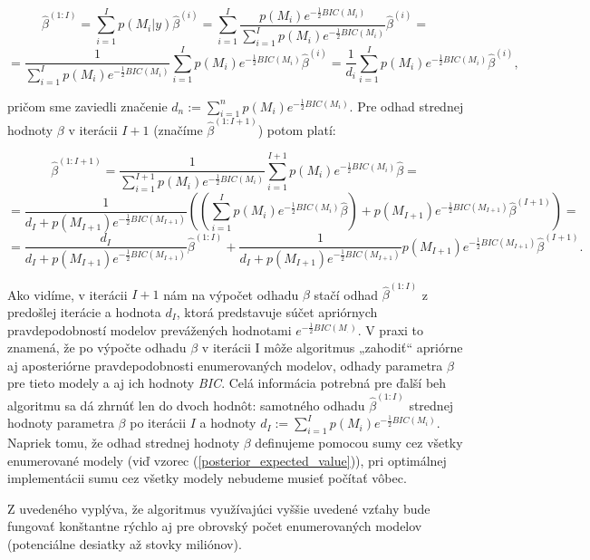 \[
    \hat{\beta}^{(1:I)} = \sum_{i = 1}^{I} p(M_i | y) \hat{\beta}^{(i)} = \sum_{i = 1}^{I} \frac{p(M_i) e^{-\frac{1}{2}BIC(M_i)}}{\sum_{i = 1}^{I} p(M_i) e^{-\frac{1}{2}BIC(M_i)}} \hat{\beta}^{(i)} =
\]
\begin{equation} \label{appendix__expected_value}
    = \frac{1}{\sum_{i = 1}^{I} p(M_i) e^{-\frac{1}{2}BIC(M_i)}} \sum_{i = 1}^{I} p(M_i) e^{-\frac{1}{2}BIC(M_i)} \hat{\beta}^{(i)} = \frac{1}{d_i} \sum_{i = 1}^{I} p(M_i) e^{-\frac{1}{2}BIC(M_i)} \hat{\beta}^{(i)},
\end{equation}

pričom sme zaviedli značenie \(d_n := \sum_{i = 1}^{n} p(M_i) e^{-\frac{1}{2}BIC(M_i)}\).
Pre odhad strednej hodnoty \(\beta\) v iterácii \(I + 1\) (značíme \(\hat{\beta}^{(1:I + 1)}\)) potom platí:

\[
    \hat{\beta}^{(1:I + 1)} = \frac{1}{\sum_{i = 1}^{I + 1} p(M_i) e^{-\frac{1}{2}BIC(M_i)}} \sum_{i = 1}^{I + 1} p(M_i) e^{-\frac{1}{2}BIC(M_i)} \hat{\beta} = 
\]
\[
    = \frac{1}{d_I + p(M_{I + 1}) e^{-\frac{1}{2}BIC(M_{I + 1})}} \left( \left( \sum_{i = 1}^{I} p(M_i) e^{-\frac{1}{2}BIC(M_i)} \hat{\beta} \right) + p(M_{I + 1}) e^{-\frac{1}{2}BIC(M_{I + 1})} \hat{\beta}^{(I+1)} \right) = 
\]
\[
    = \frac{d_I}{d_I + p(M_{I + 1}) e^{-\frac{1}{2}BIC(M_{I + 1})}} \hat{\beta}^{(1:I)} + \frac{1}{d_I + p(M_{I + 1}) e^{-\frac{1}{2}BIC(M_{I + 1})}} p(M_{I + 1}) e^{-\frac{1}{2}BIC(M_{I + 1})} \hat{\beta}^{(I+1)}.
\]

Ako vidíme, v iterácii \(I + 1\) nám na výpočet odhadu \(\beta\) stačí odhad \(\hat{\beta}^{(1:I)}\) z predošlej iterácie a hodnota \(d_I\),
ktorá predstavuje súčet apriórnych pravdepodobností modelov prevážených hodnotami \(e^{-\frac{1}{2}BIC(M_{.})}\).
V praxi to znamená, že po výpočte odhadu \(\beta\) v iterácii I môže algoritmus „zahodiť“ apriórne aj aposteriórne pravdepodobnosti enumerovaných modelov,
odhady parametra \(\beta\) pre tieto modely a aj ich hodnoty \emph{BIC}.
Celá informácia potrebná pre ďalší beh algoritmu sa dá zhrnúť len do dvoch hodnôt:
samotného odhadu \(\hat{\beta}^{(1:I)}\) strednej hodnoty parametra \(\beta\) po iterácii \(I\) a hodnoty \(d_I := \sum_{i = 1}^{I} p(M_i) e^{-\frac{1}{2}BIC(M_i)}\).
Napriek tomu, že odhad strednej hodnoty \(\beta\) definujeme pomocou sumy cez všetky enumerované modely (viď vzorec (\ref{posterior_expected_value})),
pri optimálnej implementácii sumu cez všetky modely nebudeme musieť počítať vôbec.

Z uvedeného vyplýva, že algoritmus využívajúci vyššie uvedené vzťahy bude fungovať konštantne rýchlo aj pre obrovský počet enumerovaných modelov (potenciálne desiatky až stovky miliónov).

